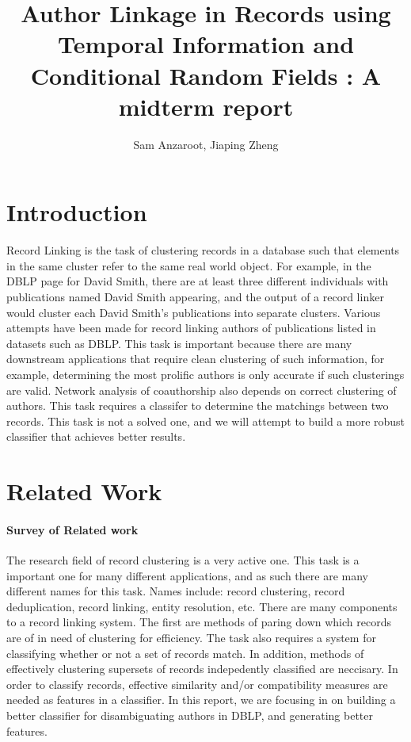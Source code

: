 \documentclass[twocolumn]{article}
\title{Author Linkage in Records using Temporal Information and Conditional Random Fields : A midterm report}
\author{Sam Anzaroot, Jiaping Zheng}
\date{}
\begin{document}
\ifpdf
{}
\else
{}
\fi

\maketitle

\section{Introduction} %
\label{sec:introduction}
Record Linking is the task of clustering records in a database such that elements in the same cluster refer to the same real world object. For example, in the DBLP page for David Smith, there are at least three different individuals with publications named David Smith appearing, and the output of a record linker would cluster each David Smith's publications into separate clusters. Various attempts have been made for record linking authors of publications listed in datasets such as DBLP. This task is important because there are many downstream applications that require clean clustering of such information, for example, determining the most prolific authors is only accurate if such clusterings are valid. Network analysis of coauthorship also depends on correct clustering of authors. This task requires a classifer to determine the matchings between two records. This task is not a solved one, and we will attempt to build a more robust classifier that achieves better results.

\section{Related Work} %
\label{sec:related_work}
\paragraph{Survey of Related work} %
\label{par:survey_of_related_work}
The research field of record clustering is a very active one. This task is a important one for many different applications, and as such there are many different names for this task. Names include: record clustering, record deduplication, record linking, entity resolution, etc. There are many components to a record linking system. The first are methods of paring down which records are of in need of clustering for efficiency. The task also requires a system for classifying whether or not a set of records match. In addition, methods of effectively clustering supersets of records indepedently classified are neccisary. In order to classify records, effective similarity and/or compatibility measures are needed as features in a classifier. In this report, we are focusing in on building a better classifier for disambiguating authors in DBLP, and generating better features. 
\end{document}
